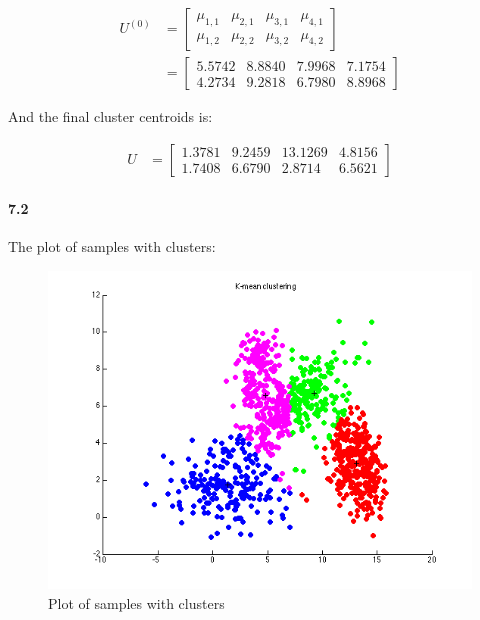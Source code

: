 \documentclass[a4paper]{article}
\begin{document}
	\begin{align}
		U^{(0)} &= \begin{bmatrix}
				\mu_{1,1}  &  \mu_{2,1}  &  \mu_{3,1}  &  \mu_{4,1} \\ 
			    \mu_{1,2}  &  \mu_{2,2}  &  \mu_{3,2}  &  \mu_{4,2}
			\end{bmatrix} \\
			&= \begin{bmatrix}
				5.5742  &  8.8840  &  7.9968  &  7.1754 \\ 
			    4.2734  &  9.2818  &  6.7980  &  8.8968
			\end{bmatrix}
	\end{align}
	
	And the final cluster centroids is: 
	
	\begin{align}
		U &= \begin{bmatrix}
				1.3781  &  9.2459  & 13.1269  &  4.8156 \\ 
			    1.7408  &  6.6790  &  2.8714  &  6.5621
			\end{bmatrix}
	\end{align}

\paragraph{7.2} The plot of samples with clusters: \\

	\begin{figure}[H]
	  \centering
	    \includegraphics[scale=.57]{images/k_mean.png}
	  \caption{Plot of samples with clusters}
	\end{figure}
\end{document}
